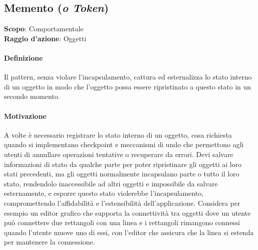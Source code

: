 \subsection{Memento (\textit{o Token})}
\label{memento}

\textbf{Scopo}: Comportamentale \\
\textbf{Raggio d'azione}: Oggetti

\paragraph{Definizione} Il pattern, senza violare l'incapsulamento, cattura ed esternalizza lo stato interno di un oggetto in modo che l'oggetto possa essere ripristinato a questo stato in un secondo momento.

\paragraph{Motivazione} A volte è necessario registrare lo stato interno di un oggetto, cosa richiesta quando si implementano checkpoint e meccanismi di undo che permettono agli utenti di annullare operazioni tentative o recuperare da errori. Devi salvare informazioni di stato da qualche parte per poter ripristinare gli oggetti ai loro stati precedenti, ma gli oggetti normalmente incapsulano parte o tutto il loro stato, rendendolo inaccessibile ad altri oggetti e impossibile da salvare esternamente, e esporre questo stato violerebbe l'incapsulamento, compromettendo l'affidabilità e l'estensibilità dell'applicazione. Considera per esempio un editor grafico che supporta la connettività tra oggetti dove un utente può connettere due rettangoli con una linea e i rettangoli rimangono connessi quando l'utente muove uno di essi, con l'editor che assicura che la linea si estenda per mantenere la connessione. 

